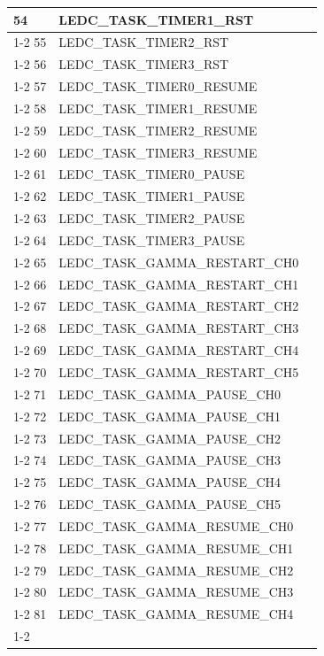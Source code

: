 \documentclass[main\_\_CN.tex]{subfiles}
\begin{document}
\begin{longtable}{ | l | l | l | }
54  & LEDC\_TASK\_TIMER1\_RST  & \\ \cline{1-2}
55  & LEDC\_TASK\_TIMER2\_RST  & \\ \cline{1-2}
56  & LEDC\_TASK\_TIMER3\_RST  & \\ \cline{1-2}
57  & LEDC\_TASK\_TIMER0\_RESUME    & \\ \cline{1-2}
58  & LEDC\_TASK\_TIMER1\_RESUME    & \\ \cline{1-2}
59  & LEDC\_TASK\_TIMER2\_RESUME    & \\ \cline{1-2}
60  & LEDC\_TASK\_TIMER3\_RESUME    & \\ \cline{1-2}
61  & LEDC\_TASK\_TIMER0\_PAUSE& \\ \cline{1-2}
62  & LEDC\_TASK\_TIMER1\_PAUSE& \\ \cline{1-2}
63  & LEDC\_TASK\_TIMER2\_PAUSE& \\ \cline{1-2}
64  & LEDC\_TASK\_TIMER3\_PAUSE& \\ \cline{1-2}
65  & LEDC\_TASK\_GAMMA\_RESTART\_CH0      & \\ \cline{1-2}
66  & LEDC\_TASK\_GAMMA\_RESTART\_CH1      & \\ \cline{1-2}
67  & LEDC\_TASK\_GAMMA\_RESTART\_CH2      & \\ \cline{1-2}
68  & LEDC\_TASK\_GAMMA\_RESTART\_CH3      & \\ \cline{1-2}
69  & LEDC\_TASK\_GAMMA\_RESTART\_CH4      & \\ \cline{1-2}
70  & LEDC\_TASK\_GAMMA\_RESTART\_CH5      & \\ \cline{1-2}
71  & LEDC\_TASK\_GAMMA\_PAUSE\_CH0 & \\ \cline{1-2}
72  & LEDC\_TASK\_GAMMA\_PAUSE\_CH1 & \\ \cline{1-2}
73  & LEDC\_TASK\_GAMMA\_PAUSE\_CH2 & \\ \cline{1-2}
74  & LEDC\_TASK\_GAMMA\_PAUSE\_CH3 & \\ \cline{1-2}
75  & LEDC\_TASK\_GAMMA\_PAUSE\_CH4 & \\ \cline{1-2}
76  & LEDC\_TASK\_GAMMA\_PAUSE\_CH5 & \\ \cline{1-2}
77  & LEDC\_TASK\_GAMMA\_RESUME\_CH0& \\ \cline{1-2}
78  & LEDC\_TASK\_GAMMA\_RESUME\_CH1& \\ \cline{1-2}
79  & LEDC\_TASK\_GAMMA\_RESUME\_CH2& \\ \cline{1-2}
80  & LEDC\_TASK\_GAMMA\_RESUME\_CH3& \\ \cline{1-2}
81  & LEDC\_TASK\_GAMMA\_RESUME\_CH4& \\ \cline{1-2}

\end{longtable}
\end{document}
